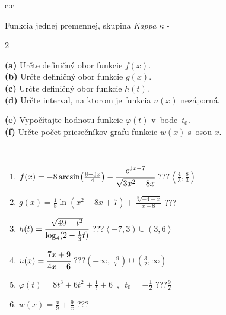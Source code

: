 \documentclass[10pt]{report}
\begin{document}
\begin{tabular}{c:c}
\begin{minipage}[c][104.5mm][t]{0.5\linewidth}
\begin{center}
\vspace{7mm}
{\huge Funkcia jednej premennej, skupina \textit{Kappa $\kappa$} -}\\[5mm]
\begin{minipage}{0.95\linewidth}
\begin{center}
{\small \begin{multicols}{2} \raggedright
\textbf{(a)} Určte definičný obor funkcie \(f(x)\). \\[1mm]
\textbf{(b)} Určte definičný obor funkcie \(g(x)\). \\[1mm]
\textbf{(c)} Určte definičný obor funkcie \(h(t)\). \\[1mm]
\textbf{(d)} Určte interval, na ktorom je funkcia \(u(x)\) nezáporná. \par \columnbreak
\textbf{(e)} Vypočítajte hodnotu funkcie \(\varphi(t)\) v~bode~\(t_0\). \\[1mm]
\textbf{(f)} Určte počet priesečníkov grafu funkcie \(w(x)\) s~osou \(x\). \\[1mm]
\end{multicols}
}
\end{center}
\end{minipage}
\\[4mm]
\begin{minipage}{0.79\linewidth}
\begin{center}
\begin{varwidth}{\linewidth}
\begin{enumerate}
\small
\item $f(x) = -8\arcsin\!\left( \frac{8-3x}{4} \right) - \cfrac{e^{3x-7}}{\sqrt{3x^2-8x}}$\quad \dotfill\; ???\;\dotfill \quad $\left\langle\frac{4}{3} , \frac{8}{3}\right)$
\item $g(x) = \frac{1}{8} \ln{\!(x^2-8x+7)}+\frac{\sqrt[3]{-4-x}}{x-8}$\quad \dotfill\; ???\;\dotfill {}
\item $h(t) = \cfrac{\sqrt{49-t^2}}{\log_4(2-\frac{1}{3}t)}$\quad \dotfill\; ???\;\dotfill \quad $\left\langle-7 , 3\right)\cup\left(3 , 6\right\rangle$
\item $u(x) = \cfrac{7x+9}{4x-6}$\quad \dotfill\; ???\;\dotfill \quad $\left(-\infty , \frac{-9}{7}\right)\cup\left(\frac{3}{2} , \infty\right)$
\item $\varphi(t) = 8t^3+6t^2+\frac{1}{t}+6 \enspace , \enspace t_0=-\frac{1}{2}$\quad \dotfill\; ???\;\dotfill \quad $\frac{9}{2}$
\item $w(x) = \frac{x}{9}+\frac{9}{x}$\quad \dotfill\; ???\;\dotfill {}

\end{enumerate}
\end{varwidth}
\end{center}
\end{minipage}
\end{center}
\end{minipage}
\end{tabular}
\end{document}
